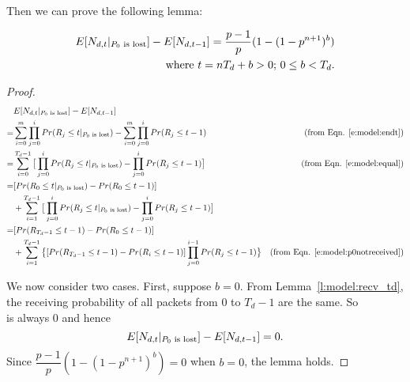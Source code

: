     Then we can prove the following lemma:
    \begin{lemma}
    \label{l:model:p0lost}
    \begin{eqnarray*}
    E[N_{d,t}|_{\textrm{$P_0$ is lost}}] - E[N_{d,t-1}] = \dfrac{p-1}{p}(1-(1-p^{n+1})^b) \\
    \textrm{where $t = nT_{d}+b > 0$; $0 \le b<T_d$.}
    \end{eqnarray*}
    \end{lemma}
    \begin{proof}
    \begin{align*}
     &E[N_{d,t}|_{\textrm{$P_0$ is lost}}] - E[N_{d,t-1}] & \\
    =& \sum_{i=0}^{m}\prod_{j=0}^{i}Pr(R_{j} \le t|_{\textrm{$P_0$ is lost}}) - \sum_{i=0}^{m}\prod_{j=0}^{i}Pr(R_{j} \le t-1) & 
        \text{(from Eqn. \ref{e:model:endt})} \\
    =& \sum_{i=0}^{T_d - 1}\big[\prod_{j=0}^{i}Pr(R_{j} \le t|_{\textrm{$P_0$ is lost}}) - \prod_{j=0}^{i}Pr(R_{j} \le t-1)\big] &
        \text{(from Eqn. \ref{e:model:equal})}\\
    =& [Pr(R_0 \le t|_{\textrm{$P_0$ is lost}}) - Pr(R_0 \le t - 1)] \\
     &+ \sum_{i=1}^{T_d-1}\big[\prod_{j=0}^{i}Pr(R_{j} \le t|_{\textrm{$P_0$ is lost}}) - \prod_{j=0}^{i}Pr(R_{j} \le t-1)\big]\\ 
    =& [Pr(R_{T_d-1} \le t-1) - Pr(R_0 \le t-1)] \\
     &+ \sum_{i=1}^{T_d - 1}\big\{[Pr(R_{T_d-1} \le t-1) - Pr(R_{i} \le t-1)]\prod_{j=0}^{i-1}Pr(R_{j} \le t-1)\big\} 
        & \text{(from Eqn. \ref{e:model:p0notreceived})}\\
    \end{align*}

    We now consider two cases.  First, suppose $b = 0$.  From Lemma~\ref{l:model:recv_td}, the receiving probability of 
    all packets from 0 to $T_d - 1$ are the same. So 
    \begin{displaymath}
    [Pr(R_{T_d-1} \leq t-1) - Pr(R_i \leq t-1)]
    \end{displaymath}
    is always 0 and hence 
    \begin{displaymath}
    E[N_{d,t}|_{\textrm{$P_0$ is lost}}] - E[N_{d,t-1}] = 0. 
    \end{displaymath}
    Since $\dfrac{p-1}{p}(1- (1-p^{n+1})^b) = 0$
    when $b = 0$, the lemma holds.


\end{proof}
